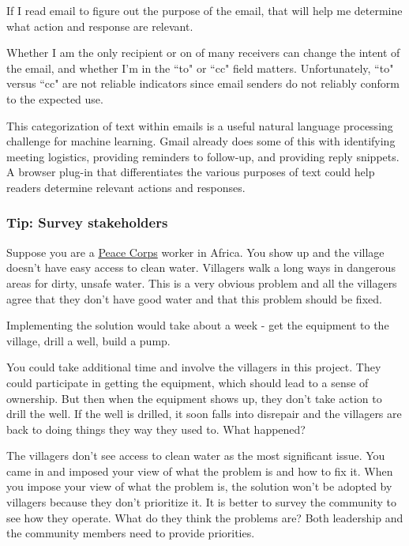 If I read email to figure out the purpose of the email, that will help me determine what action and response are relevant. 

Whether I am the only recipient or on of many receivers can change the intent of the email, and whether I'm in the ``to" or ``cc" field matters. Unfortunately, ``to" versus ``cc" are not reliable indicators since email senders do not reliably conform to the expected use. 



This categorization of text within emails is a useful natural language processing challenge for machine learning. Gmail already does some of this with identifying meeting logistics, providing reminders to follow-up, and providing reply snippets. A browser plug-in that differentiates the various purposes of text could help readers determine relevant actions and responses. 



\subsubsection{Tip: Survey stakeholders}

Suppose you are a \href{http://www.peacecorps.gov/}{Peace Corps} worker in Africa. You show up and the village doesn't have easy access to clean water. Villagers walk a long ways in dangerous areas for dirty, unsafe water. This is a very obvious problem and all the villagers agree that they don't have good water and that this problem should be fixed.

Implementing the solution would take about a week - get the equipment to the village, drill a well, build a pump.

You could take additional time and involve the villagers in this project. They could participate in getting the equipment, which should lead to a sense of ownership.
But then when the equipment shows up, they don't take action to drill the well. If the well is drilled, it soon falls into disrepair and the villagers are back to doing things they way they used to. What happened?

The villagers don't see access to clean water as the most significant issue. You came in and imposed your view of what the problem is and how to fix it. When you impose your view of what the problem is, the solution won't be adopted by villagers because they don't prioritize it.
It is better to survey the community to see how they operate. What do they think the problems are?
Both leadership and the community members need to provide priorities.

